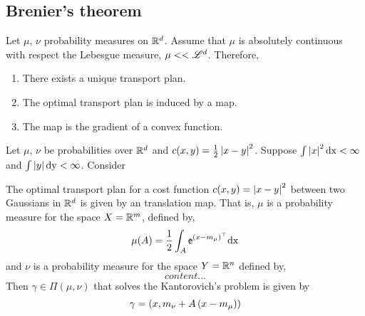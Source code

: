 \subsection{Brenier's theorem}

\begin{theorem}
	Let $\mu$, $\nu$ probability measures on $\mathbb{R}^d$. Assume that $\mu$ is absolutely continuous with respect the Lebesgue measure, $\mu<<\mathscr{L}^d$. Therefore,
	\begin{enumerate}
		\item There exists a unique transport plan.
		\item The optimal transport plan is induced by a map.
		\item The map is the gradient of a convex function. 
	\end{enumerate}
\end{theorem}

\begin{theorem}
	Let $\mu$, $\nu$  be probabilities over $\mathbb{R}^d$ and $c(x,y)=\frac{1}{2}\left| x-y \right|^2$. Suppose $\int \left| x \right|^2 \mathrm{dx} <\infty$ and $\int \left| y \right|\mathrm{dy}<\infty$. Consider
\end{theorem}


\begin{theorem}
	The optimal transport plan for a cost function $c(x,y)=\left| x-y \right|^2$ between two Gaussians in $\mathbb{R}^d$ is given by an translation map.
	That is, $\mu$ is a probability measure for the space $X=\mathbb{R}^m$, defined by,
	\begin{equation*}
	\mu(A)=\frac{1}{2}\int_{A} \mathsf{e}^{(x-m_\mu)^\top}\mathrm{dx}	
	\end{equation*}
	and $\nu$ is a probability measure for the space $Y=\mathbb{R}^n$ defined by,
	\begin{equation*}
		content...
	\end{equation*} 
	Then $\gamma\in \Pi(\mu,\nu)$ that solves the Kantorovich's problem is given by 
	\begin{equation}
		\gamma=\left( x, m_\nu+A\left( x-m_\mu \right) \right)
	\end{equation}
\end{theorem}


